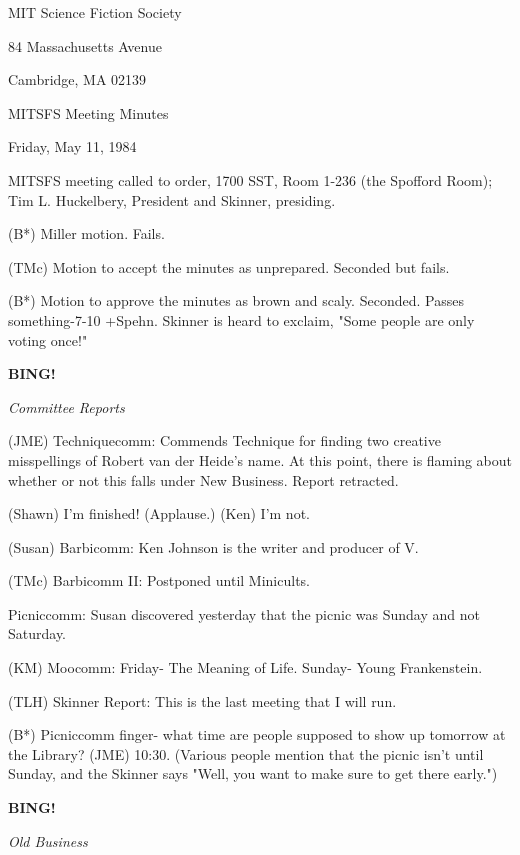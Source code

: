 \documentclass[12pt]{article}
\newcommand{\bing}{{\bf BING!} }
\newcommand{\goto}[1]{\bing \vskip 12pt \centerline{{\em{#1}}}}
\begin{document}
\begin{center}

MIT Science Fiction Society 

84 Massachusetts Avenue

Cambridge, MA 02139

\vspace{12pt}

MITSFS Meeting Minutes 

Friday, May 11, 1984

\end{center}
 
\vspace{18pt}

\setlength{\parskip}{6pt}

\noindent
MITSFS meeting called to order, 1700 SST, Room 1-236 (the Spofford Room);
Tim L. Huckelbery, President and Skinner, presiding.

(B*) Miller motion. Fails.

(TMc) Motion to accept the minutes as unprepared. Seconded but fails.

(B*) Motion to approve the minutes as brown and scaly. Seconded. Passes something-7-10 +Spehn. Skinner is heard to exclaim, "Some people are only voting once!"

\goto{Committee Reports}

(JME) Techniquecomm: Commends Technique for finding two creative misspellings of Robert van der Heide's name. At this point, there is flaming about whether or not this falls under New Business. Report retracted.

(Shawn) I'm finished! (Applause.) (Ken) I'm not.

(Susan) Barbicomm: Ken Johnson is the writer and producer of V.

(TMc) Barbicomm II: Postponed until Minicults.

Picniccomm: Susan discovered yesterday that the picnic was Sunday and not Saturday.

(KM) Moocomm: Friday- The Meaning of Life. Sunday- Young Frankenstein.

(TLH) Skinner Report: This is the last meeting that I will run.

(B*) Picniccomm finger- what time are people supposed to show up tomorrow at the Library? (JME) 10:30. (Various people mention that the picnic isn't until Sunday, and the Skinner says "Well, you want to make sure to get there early.")

\goto{Old Business}
\end{document}
